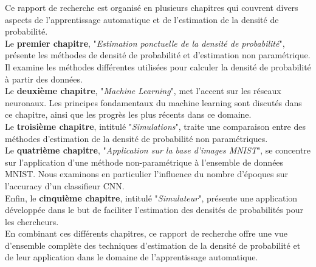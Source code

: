 Ce rapport de recherche est organisé en plusieurs chapitres qui couvrent divers aspects de l'apprentissage automatique et de l'estimation de la densité de probabilité.\\
Le \textbf{premier chapitre}, "\textit{Estimation ponctuelle de la densité de probabilité}", présente les méthodes de densité de probabilité et d'estimation non paramétrique. Il examine les méthodes différentes utilisées pour calculer la densité de probabilité à partir des données.\\
Le \textbf{deuxième chapitre}, "\textit{Machine Learning}", met l'accent sur les réseaux neuronaux. Les principes fondamentaux du machine learning sont discutés dans ce chapitre, ainsi que les progrès les plus récents dans ce domaine.\\
Le \textbf{troisième chapitre}, intitulé "\textit{Simulations}", traite une comparaison entre des méthodes d'estimation de la densité de probabilité non paramétriques. \\
Le \textbf{quatrième chapitre}, "\textit{Application sur la base d'images MNIST}", se concentre sur l'application d'une méthode non-paramétrique à l'ensemble de données MNIST. Nous examinons en particulier l'influence du nombre d'époques sur l'accuracy d'un classifieur CNN.\\
Enfin, le \textbf{cinquième chapitre}, intitulé "\textit{Simulateur}", présente une application développée dans le but de faciliter l'estimation des densités de probabilités pour les chercheurs.\\
En combinant ces différents chapitres, ce rapport de recherche offre une vue d'ensemble complète des techniques d'estimation de la densité de probabilité et de leur application dans le domaine de l'apprentissage automatique.



































